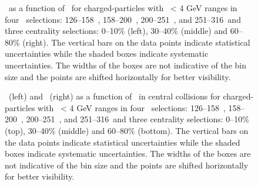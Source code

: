\begin{figure}
   \caption{\DeltaTheta\ as a function of \rvar\ for charged-particles with \pt\ < 4 GeV ranges in 
   four \ptjet\ selections: 126--158~\GeV, 158--200~\GeV, 200--251~\GeV, and 251--316~\GeV and three centrality 
   selections: 0--10\% (left), 30--40\% (middle) and 60--80\% (right). 
   The vertical bars on the data points indicate statistical uncertainties while the shaded boxes indicate systematic uncertainties. The widths of the boxes are not indicative of the bin size and the points are shifted horizontally for better visibility. }
      \label{fig:deltaPdeltaT}
\end{figure}


\begin{figure}
   \caption{\RTheta\ (left) and \RP\ (right) as a function of \rvar\ in central collisions for charged-particles with \pt\ < 4 GeV ranges in four \ptjet\ selections: 126--158~\GeV, 158--200~\GeV, 200--251~\GeV, and 251--316~\GeV and three centrality selections: 0--10\% (top), 30--40\% (middle) and 60--80\% (bottom). The vertical bars on the data points indicate statistical uncertainties while the shaded boxes indicate systematic uncertainties. The widths of the boxes are not indicative of the bin size and the points are shifted horizontally for better visibility. }
      \label{fig:RPRT}
\end{figure}


